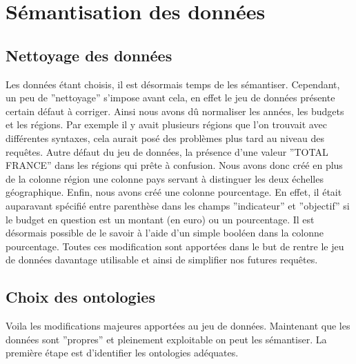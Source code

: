 \documentclass[a4paper,sffamily,12pt]{article}
\begin{document}
		\vspace{0.5cm}
		
	\section{Sémantisation des données}				

		\vspace{0.5cm}
		
		\subsection{Nettoyage des données}
			
			\vspace{0.5cm}
			
			Les données étant choisis, il est désormais temps de les sémantiser. Cependant, un peu de ''nettoyage'' s'impose avant cela, en effet le jeu de données présente certain défaut à corriger. Ainsi nous avons dû normaliser les années, les budgets et les régions. Par exemple il y avait plusieurs régions que l'on trouvait avec différentes syntaxes, cela aurait posé des problèmes plus tard au niveau des requêtes. Autre défaut du jeu de données, la présence d'une valeur ''TOTAL FRANCE'' dans les régions qui prête à confusion. Nous avons donc créé en plus de la colonne région une colonne pays servant à distinguer les deux échelles géographique. Enfin, nous avons créé une colonne pourcentage. En effet, il était auparavant spécifié entre parenthèse dans les champs ''indicateur'' et ''objectif'' si le budget en question est un montant (en euro) ou un pourcentage. Il est désormais possible de le savoir à l'aide d'un simple booléen dans la colonne pourcentage. Toutes ces modification sont apportées dans le but de rentre le jeu de données davantage utilisable et ainsi de simplifier nos futures requêtes.
		
			\vspace{0.5cm}
		
		\subsection{Choix des ontologies}
		
			\vspace{0.5cm}
			
			Voila les modifications majeures apportées au jeu de données. Maintenant que les données sont ''propres'' et pleinement exploitable on peut les sémantiser. La première étape est d'identifier les ontologies adéquates. \\
		
\end{document}
